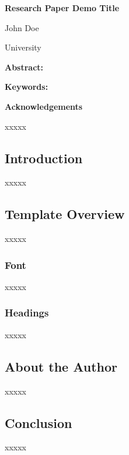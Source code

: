 \documentclass[11pt]{article}
\begin{document}
\small

\begin{center}
\Large
\textbf{Research Paper Demo Title}

\vspace{2em}

\normalsize
John Doe\footnotemark[1]

\vspace{0.1em}

University \\
\end{center}

\vspace{2em}

\noindent\textbf{Abstract:} 

\vspace{1em}

\noindent\textbf{Keywords:}





\newpage

\thispagestyle{empty}
\vspace*{\fill}

\begin{center}
\textbf{Acknowledgements}
\end{center}

\noindent
xxxxx


\vspace*{\fill}

\newpage
\subsection{Introduction}

xxxxx

\subsection{Template Overview}

xxxxx

\subsubsection{Font}

xxxxx

\subsubsection{Headings}

xxxxx


\subsection{About the Author}

xxxxx

\subsection{Conclusion}

xxxxx
\end{document}
